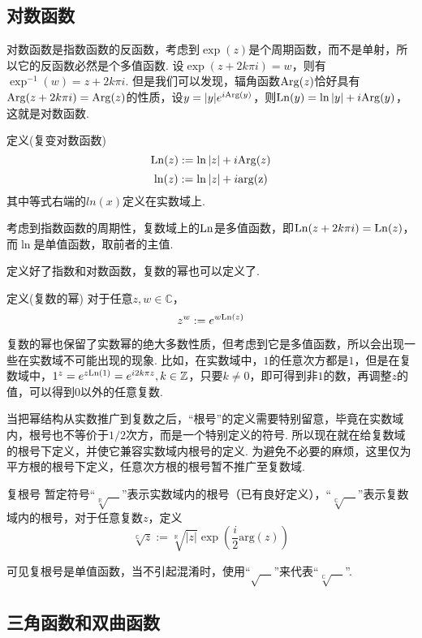 \documentclass[main.tex]{subfiles}
\begin{document}
\subsection{对数函数}

对数函数是指数函数的反函数，考虑到\(\exp(z)\)是个周期函数，而不是单射，所以它的反函数必然是个多值函数. 设\(\exp(z+2k\pi i)=w\)，则有\(\exp^{-1}(w)=z+2k\pi i\). 但是我们可以发现，辐角函数\({\rm Arg}(z)\)恰好具有\({\rm Arg}(z+2k\pi i)={\rm Arg}(z)\)的性质，设\(y=|y|e^{i{\rm Arg}(y)}\)，则\({\rm Ln}(y)=\ln|y|+i{\rm Arg}(y)\)，这就是对数函数.
\begin{definition}{定义(复变对数函数)}
    \[{\rm Ln}(z):=\ln|z|+i{\rm Arg}(z)\]
    \[\ln(z):=\ln|z|+i{\rm arg(z)}\]
    其中等式右端的\(ln(x)\)定义在实数域上.
\end{definition}
考虑到指数函数的周期性，复数域上的\({\rm Ln}\)是多值函数，即\({\rm Ln}(z+2k\pi i)={\rm Ln}(z)\)，而\(\ln\)是单值函数，取前者的主值.

定义好了指数和对数函数，复数的幂也可以定义了. 
\begin{definition}{定义(复数的幂)}
    对于任意\(z,w \in \mathbb{C}\)，
    \[z^w := e^{w{\rm Ln}(z)}\]
\end{definition}

复数的幂也保留了实数幂的绝大多数性质，但考虑到它是多值函数，所以会出现一些在实数域不可能出现的现象. 比如，在实数域中，\(1\)的任意次方都是\(1\)，但是在复数域中，\(1^z = e^{z{\rm Ln}(1)} = e^{i2k\pi z}, k \in \mathbb{Z}\)，只要\(k \neq  0\)，即可得到非\(1\)的数，再调整\(z\)的值，可以得到\(0\)以外的任意复数.

当把幂结构从实数推广到复数之后，“根号”的定义需要特别留意，毕竟在实数域内，根号也不等价于\(1/2\)次方，而是一个特别定义的符号. 所以现在就在给复数域的根号下定义，并使它兼容实数域内根号的定义. 为避免不必要的麻烦，这里仅为平方根的根号下定义，任意次方根的根号暂不推广至复数域.

\begin{definition}{复根号}
    暂定符号“\(\sqrt[\mathbb{R}]{\quad}\)”表示实数域内的根号（已有良好定义），“\(\sqrt[\mathbb{C}]{\quad}\)”表示复数域内的根号，对于任意复数\(z\)，定义
    \[\sqrt[\mathbb{C}]{z} := \sqrt[\mathbb{R}]{|z|}\exp\left(\frac{i}{2}\mathrm{arg}(z)\right)\]
\end{definition}
可见复根号是单值函数，当不引起混淆时，使用“\(\sqrt{\quad}\)”来代表“\(\sqrt[\mathbb{C}]{\quad}\)”.

\subsection{三角函数和双曲函数}
\end{document}
